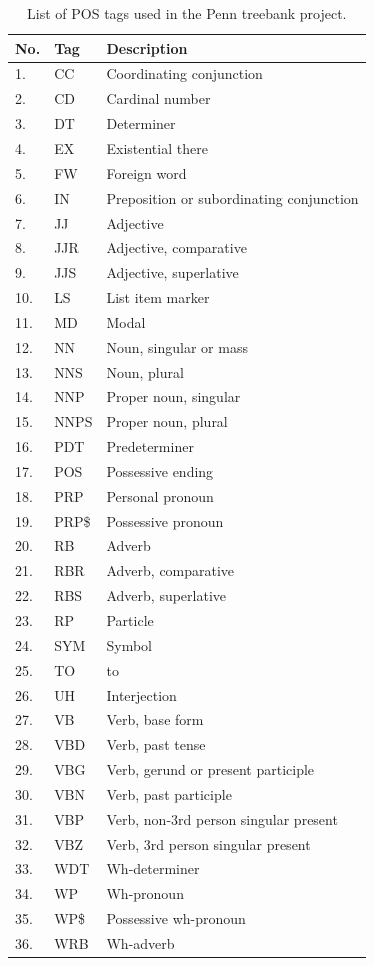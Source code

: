 \begin{table}[t]
\small
\centering
\begin{tabular}{| l | l | l |} 
\hline
    No. & Tag & Description \\
\hline
    1. & CC & Coordinating conjunction \\
    2. & CD & Cardinal number \\
    3. & DT & Determiner \\
    4. & EX & Existential there \\
    5. & FW & Foreign word \\
    6. & IN & Preposition or subordinating conjunction \\
    7. & JJ & Adjective \\
    8. & JJR & Adjective, comparative \\
    9. & JJS & Adjective, superlative \\
    10. & LS & List item marker \\
    11. & MD & Modal \\
    12. & NN & Noun, singular or mass \\
    13. & NNS & Noun, plural \\
    14. & NNP & Proper noun, singular \\
    15. & NNPS & Proper noun, plural \\
    16. & PDT & Predeterminer \\
    17. & POS & Possessive ending \\
    18. & PRP & Personal pronoun \\
    19. & PRP\$ & Possessive pronoun \\
    20. & RB & Adverb \\
    21. & RBR & Adverb, comparative \\
    22. & RBS & Adverb, superlative \\
    23. & RP & Particle \\
    24. & SYM & Symbol \\
    25. & TO & to \\
    26. & UH & Interjection \\
    27. & VB & Verb, base form \\
    28. & VBD & Verb, past tense \\
    29. & VBG & Verb, gerund or present participle \\
    30. & VBN & Verb, past participle \\
    31. & VBP & Verb, non-3rd person singular present \\
    32. & VBZ & Verb, 3rd person singular present \\
    33. & WDT & Wh-determiner \\
    34. & WP & Wh-pronoun \\
    35. & WP\$ & Possessive wh-pronoun \\
    36. & WRB & Wh-adverb \\
\hline
\end{tabular}
\caption{List of POS tags used in the Penn treebank project.}
\label{tab:penn-pos}
\end{table}

